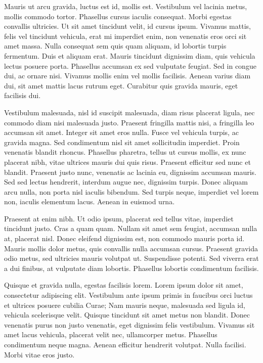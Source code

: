 Mauris ut arcu gravida, luctus est id, mollis est. Vestibulum vel lacinia metus, mollis commodo tortor. Phasellus cursus iaculis consequat. Morbi egestas convallis ultricies. Ut sit amet tincidunt velit, id cursus ipsum. Vivamus mattis, felis vel tincidunt vehicula, erat mi imperdiet enim, non venenatis eros orci sit amet massa. Nulla consequat sem quis quam aliquam, id lobortis turpis fermentum. Duis et aliquam erat. Mauris tincidunt dignissim diam, quis vehicula lectus posuere porta. Phasellus accumsan ex sed vulputate feugiat. Sed in congue dui, ac ornare nisi. Vivamus mollis enim vel mollis facilisis. Aenean varius diam dui, sit amet mattis lacus rutrum eget. Curabitur quis gravida mauris, eget facilisis dui.

Vestibulum malesuada, nisl id suscipit malesuada, diam risus placerat ligula, nec commodo diam nisi malesuada justo. Praesent fringilla mattis nisi, a fringilla leo accumsan sit amet. Integer sit amet eros nulla. Fusce vel vehicula turpis, ac gravida magna. Sed condimentum nisl sit amet sollicitudin imperdiet. Proin venenatis blandit rhoncus. Phasellus pharetra, tellus ut cursus mollis, ex nunc placerat nibh, vitae ultrices mauris dui quis risus. Praesent efficitur sed nunc et blandit. Praesent justo nunc, venenatis ac lacinia eu, dignissim accumsan mauris. Sed sed lectus hendrerit, interdum augue nec, dignissim turpis. Donec aliquam arcu nulla, non porta nisl iaculis bibendum. Sed turpis neque, imperdiet vel lorem non, iaculis elementum lacus. Aenean in euismod urna.

Praesent at enim nibh. Ut odio ipsum, placerat sed tellus vitae, imperdiet tincidunt justo. Cras a quam quam. Nullam sit amet sem feugiat, accumsan nulla at, placerat nisl. Donec eleifend dignissim est, non commodo mauris porta id. Mauris mollis dolor metus, quis convallis nulla accumsan cursus. Praesent gravida odio metus, sed ultricies mauris volutpat ut. Suspendisse potenti. Sed viverra erat a dui finibus, at vulputate diam lobortis. Phasellus lobortis condimentum facilisis.

Quisque et gravida nulla, egestas facilisis lorem. Lorem ipsum dolor sit amet, consectetur adipiscing elit. Vestibulum ante ipsum primis in faucibus orci luctus et ultrices posuere cubilia Curae; Nam mauris neque, malesuada sed ligula id, vehicula scelerisque velit. Quisque tincidunt sit amet metus non blandit. Donec venenatis purus non justo venenatis, eget dignissim felis vestibulum. Vivamus sit amet lacus vehicula, placerat velit nec, ullamcorper metus. Phasellus condimentum neque magna. Aenean efficitur hendrerit volutpat. Nulla facilisi. Morbi vitae eros justo.

